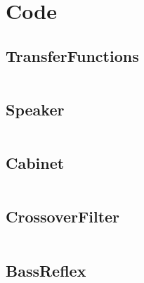 \appendix

\chapter{Code}
\label{app:code}

\section{TransferFunctions}
\inputminted[linenos, breaklines, bgcolor=lightgray]{matlab}{../Matlab/TransferFunctions.m}

\section{Speaker}
\inputminted[linenos, breaklines, bgcolor=lightgray]{matlab}{../Matlab/Speaker.m}

\section{Cabinet}
\inputminted[linenos, breaklines, bgcolor=lightgray]{matlab}{../Matlab/Cabinet.m}

\section{CrossoverFilter}
\inputminted[linenos, breaklines, bgcolor=lightgray]{matlab}{../Matlab/CrossoverFilter.m}

\section{BassReflex}
\inputminted[linenos, breaklines, bgcolor=lightgray]{matlab}{../Matlab/BassReflex.m}